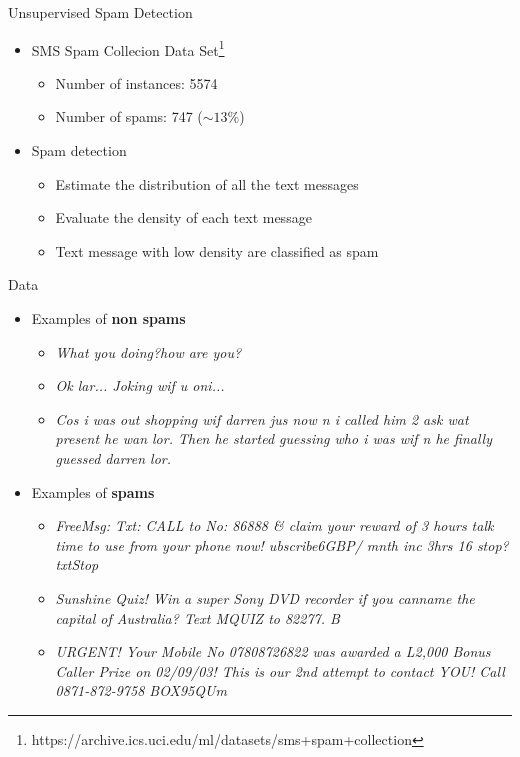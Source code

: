 \documentclass{beamer}
\begin{document}
\begin{frame}{Unsupervised Spam Detection}
\begin{itemize}
	\item SMS Spam Collecion Data Set\footnote{https://archive.ics.uci.edu/ml/datasets/sms+spam+collection}\begin{itemize}
		\item Number of instances: 5574
		\item Number of spams: 747 ($\sim 13 \%$)
	\end{itemize} 
	\item Spam detection
	\begin{itemize}
		\item Estimate the distribution of all the text messages
		\item Evaluate the density of each text message
		\item Text message with low density are classified as spam
	\end{itemize}
\end{itemize}
\end{frame}

\begin{frame}{Data}
\begin{itemize}
	\item Examples of \textbf{non spams}
	\begin{itemize}
		\item \textit{What you doing?how are you?}
		\item \textit{Ok lar... Joking wif u oni...} 
		\item \textit{Cos i was out shopping wif darren jus now n i called him 2 ask wat present he wan lor. Then he started guessing who i was wif n he finally guessed darren lor.}
	\end{itemize} 
	\item Examples of \textbf{spams}
	\begin{itemize}
		\item  \textit{FreeMsg: Txt: CALL to No: 86888 \& claim your reward of 3 hours talk time to use from your phone now! ubscribe6GBP/ mnth inc 3hrs 16 stop?txtStop}
		\item  \textit{Sunshine Quiz! Win a super Sony DVD recorder if you canname the capital of Australia? Text MQUIZ to 82277. B}
		\item \textit{URGENT! Your Mobile No 07808726822 was awarded a L2,000 Bonus Caller Prize on 02/09/03! This is our 2nd attempt to contact YOU! Call 0871-872-9758 BOX95QUm}
	\end{itemize}
\end{itemize}
\end{frame}
\end{document}
